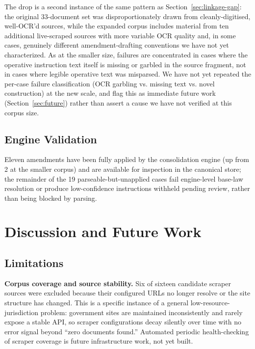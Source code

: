 \documentclass{IOS-Book-Article}
\begin{document}
The drop is a second instance of the same pattern as Section~\ref{sec:linkage-gap}: the original
33-document set was disproportionately drawn from cleanly-digitised, well-OCR'd sources, while
the expanded corpus includes material from ten additional live-scraped sources with more
variable OCR quality and, in some cases, genuinely different amendment-drafting
conventions we have not yet characterized. As at the smaller size, failures are
concentrated in cases where the operative instruction text itself is missing or garbled in
the source fragment, not in cases where legible operative text was misparsed. We have
not yet repeated the per-case failure classification (OCR garbling vs. missing
text vs. novel construction) at the new scale, and flag this as immediate future work
(Section~\ref{sec:future}) rather than assert a cause we have not verified at this corpus size.

\subsection{Engine Validation}

Eleven amendments have been fully applied by the consolidation engine (up from 2 at the
smaller corpus) and are available for inspection in the canonical store; the remainder of
the 19 parseable-but-unapplied cases fail engine-level base-law resolution or produce
low-confidence instructions withheld pending review, rather than being blocked by parsing.

\section{Discussion and Future Work}
\label{sec:discussion}

\subsection{Limitations}
\label{sec:limitations}

\textbf{Corpus coverage and source stability.} Six of sixteen candidate scraper sources were
excluded because their configured URLs no longer resolve or the site structure has changed.
This is a specific instance of a general low-resource-jurisdiction problem: government sites are
maintained inconsistently and rarely expose a stable API, so scraper configurations decay
silently over time with no error signal beyond ``zero documents found.'' Automated periodic
health-checking of scraper coverage is future infrastructure work, not yet built.
\end{document}
